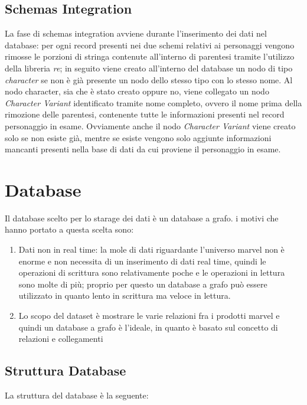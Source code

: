 \documentclass[
12pt, %
a4paper, %
oneside, %
headinclude,footinclude, %
BCOR5mm, %
]{scrartcl}
\begin{document}
\subsection{Schemas Integration}
La fase di schemas integration avviene durante l'inserimento dei dati nel database: per ogni record presenti nei due schemi relativi ai personaggi vengono rimosse le porzioni di stringa contenute all'interno di parentesi tramite l'utilizzo della libreria \textit{re}; in seguito viene creato all'interno del database un nodo di tipo \textit{character} se non è già presente un nodo dello stesso tipo con lo stesso nome. Al nodo character, sia che è stato creato oppure no, viene collegato un nodo \textit{Character Variant} identificato tramite nome completo, ovvero il nome prima della rimozione delle parentesi, contenente tutte le informazioni presenti nel record personaggio in esame. Ovviamente anche il nodo \textit{Character Variant} viene creato solo se non esiste già, mentre se esiste vengono solo aggiunte informazioni mancanti presenti nella base di dati da cui proviene il personaggio in esame.
\section{Database}
Il database scelto per lo starage dei dati è un database a grafo. i motivi che hanno portato a questa scelta sono:
\begin{enumerate}
	\item Dati non in real time: la mole di dati riguardante l'universo marvel non è enorme e non necessita di un inserimento di dati real time, quindi le operazioni di scrittura sono relativamente poche e le operazioni in lettura sono molte di più; proprio per questo un database a grafo può essere utilizzato in quanto lento in scrittura ma veloce in lettura.
	\item Lo scopo del dataset è mostrare le varie relazioni fra i prodotti marvel e quindi un database a grafo è l'ideale, in quanto è basato sul concetto di relazioni e collegamenti
\end{enumerate}
\subsection{Struttura Database}
La struttura del database è la seguente:
\end{document}
